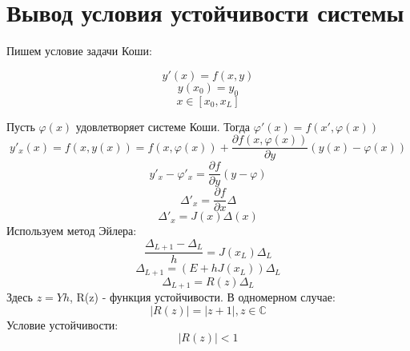 \documentclass[a4paper,12pt]{article}
\begin{document}
\section*{Вывод условия устойчивости системы}
Пишем условие задачи Коши:

\[y'(x) = f(x, y)\]
\[y(x_0) = y_0\]
\[x \in [x_0, x_L]\]

Пусть $\varphi(x)$ удовлетворяет системе Коши. Тогда $\varphi '(x) = f (x', \varphi(x))$
\[y'_x(x) = f(x, y(x)) = f(x, \varphi(x)) + \frac{\partial f(x, \varphi(x))}{\partial y}(y(x) - \varphi(x))\]
\[y'_x - \varphi'_x = \frac{\partial f}{\partial y} (y - \varphi)\]
\[\Delta'_x = \frac{\partial f}{\partial x} \Delta\]
\[\Delta'_x = J(x) \Delta(x)\]
Используем метод Эйлера:
\[\frac{\Delta_{L+1} - \Delta_L}{h} = J(x_L) \Delta_L\]
\[\Delta_{L+1} = (E + hJ(x_L)) \Delta_L\]
\[\Delta_{L+1} = R(z) \Delta_L\]
Здесь $z = Yh$, R(z) - функция устойчивости. В  одномерном случае:
$$|R(z)| = |z + 1|, z \in \mathds{C}$$
Условие устойчивости:
\[|R(z)| < 1\]
\end{document}
